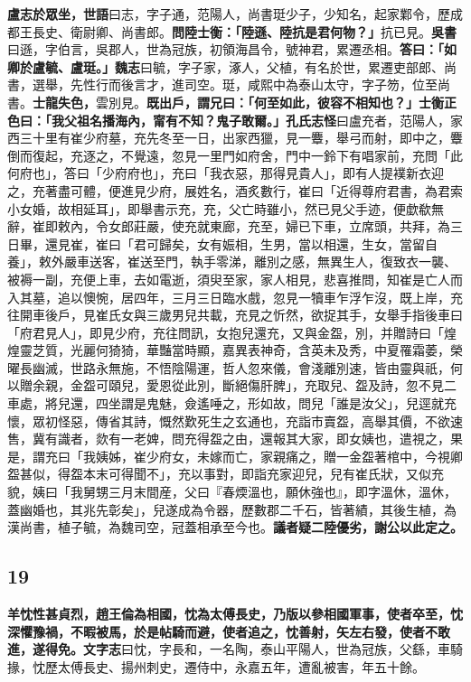 \textbf{盧志於眾坐，}{\footnotesize \textbf{世語}曰志，字子通，范陽人，尚書珽少子，少知名，起家鄴令，歷成都王長史、衛尉卿、尚書郎。}\textbf{問陸士衡：「陸遜、陸抗是君何物？」}{\footnotesize 抗已見。\textbf{吳書}曰遜，字伯言，吳郡人，世為冠族，初領海昌令，號神君，累遷丞相。}\textbf{答曰：「如卿於盧毓、盧珽。」}{\footnotesize \textbf{魏志}曰毓，字子家，涿人，父植，有名於世，累遷吏部郎、尚書，選舉，先性行而後言才，進司空。珽，咸熙中為泰山太守，字子笏，位至尚書。}\textbf{士龍失色，}{\footnotesize 雲別見。}\textbf{既出戶，謂兄曰：「何至如此，彼容不相知也？」士衡正色曰：「我父祖名播海內，甯有不知？鬼子敢爾。」}{\footnotesize \textbf{孔氏志怪}曰盧充者，范陽人，家西三十里有崔少府墓，充先冬至一日，出家西獵，見一麞，舉弓而射，即中之，麞倒而復起，充逐之，不覺遠，忽見一里門如府舍，門中一鈴下有唱家前，充問「此何府也」，答曰「少府府也」，充曰「我衣惡，那得見貴人」，即有人提襆新衣迎之，充著盡可體，便進見少府，展姓名，酒炙數行，崔曰「近得尊府君書，為君索小女婚，故相延耳」，即舉書示充，充，父亡時雖小，然已見父手迹，便歔欷無辭，崔即敕內，令女郎莊嚴，使充就東廊，充至，婦已下車，立席頭，共拜，為三日畢，還見崔，崔曰「君可歸矣，女有娠相，生男，當以相還，生女，當留自養」，敕外嚴車送客，崔送至門，執手零涕，離別之感，無異生人，復致衣一襲、被褥一副，充便上車，去如電逝，須臾至家，家人相見，悲喜推問，知崔是亡人而入其墓，追以懊惋，居四年，三月三日臨水戲，忽見一犢車乍浮乍沒，既上岸，充往開車後戶，見崔氏女與三歲男兒共載，充見之忻然，欲捉其手，女舉手指後車曰「府君見人」，即見少府，充往問訊，女抱兒還充，又與金盌，別，并贈詩曰「煌煌靈芝質，光麗何猗猗，華豔當時顯，嘉異表神奇，含英未及秀，中夏罹霜萎，榮曜長幽滅，世路永無施，不悟陰陽運，哲人忽來儀，會淺離別速，皆由靈與祇，何以贈余親，金盌可頤兒，愛恩從此別，斷絕傷肝脾」，充取兒、盌及詩，忽不見二車處，將兒還，四坐謂是鬼魅，僉遙唾之，形如故，問兒「誰是汝父」，兒逕就充懷，眾初怪惡，傳省其詩，慨然歎死生之玄通也，充詣市賣盌，高舉其價，不欲速售，冀有識者，欻有一老婢，問充得盌之由，還報其大家，即女姨也，遣視之，果是，謂充曰「我姨姊，崔少府女，未嫁而亡，家親痛之，贈一金盌著棺中，今視卿盌甚似，得盌本末可得聞不」，充以事對，即詣充家迎兒，兒有崔氏狀，又似充貌，姨曰「我舅甥三月末間産，父曰『春煗溫也，願休強也』，即字溫休，溫休，蓋幽婚也，其兆先彰矣」，兒遂成為令器，歷數郡二千石，皆著績，其後生植，為漢尚書，植子毓，為魏司空，冠蓋相承至今也。}\textbf{議者疑二陸優劣，謝公以此定之。}

\subsection*{19}

\textbf{羊忱性甚貞烈，趙王倫為相國，忱為太傅長史，乃版以參相國軍事，使者卒至，忱深懼豫禍，不暇被馬，於是帖騎而避，使者追之，忱善射，矢左右發，使者不敢進，遂得免。}{\footnotesize \textbf{文字志}曰忱，字長和，一名陶，泰山平陽人，世為冠族，父繇，車騎掾，忱歷太傅長史、揚州刺史，遷侍中，永嘉五年，遭亂被害，年五十餘。}

